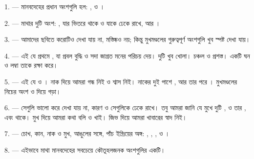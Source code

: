 %

\VUsaut{4.0mm}
\VUsaut{2.0mm}

\VUsaut{2.4mm}
\VUsaut{3.0mm}

1. --- মানবদেহের প্রধান অংশগুলি হল: ,  ও
।

\VUsaut{3.0mm}

2. --- মাথার দুটি অংশ: , যার ভিতরে  থাকে ও
যাকে  ঢেকে রাখে, আর ।

3. --- আমাদের ছবিতে করোটিও দেখা যায় না, মস্তিষ্কও নয়; কিন্তু মুখমণ্ডলের
গুরুত্বপূর্ণ অংশগুলি খুব স্পষ্ট দেখা যায়।

4. --- এই যে প্রথমে , যা প্রবল বুদ্ধি ও সদা জাগ্রত মনের পরিচয়
দেয়।  দুটি খুব খোলা।  চঞ্চল ও প্রশস্ত। একটি ঘন
 ও লম্বা  তাকে রক্ষা করে।

5. --- এই যে  ও । নাক দিয়ে আমরা গন্ধ নিই ও
শ্বাস নিই। নাকের দুই পাশে , আর তার পরে । মুখমণ্ডলের
নিচের অংশ  ও  দিয়ে গড়া।

6. --- সেগুলি ভালো করে দেখা যায় না, কারণ  ও 
সেগুলিকে ঢেকে রাখে। তবু আমরা জানি যে মুখে দুটি ,
 ও  তার , এবং
 থাকে। মুখ দিয়ে আমরা কথা বলি ও খাই। জিভ দিয়ে আমরা খাবারের
স্বাদ নিই।

7. --- চোখ, কান, নাক ও মুখ, আঙুলের সঙ্গে, পাঁচ ইন্দ্রিয়ের অঙ্গ:
, , ,  ও
।

8. --- এইভাবে মাথা মানবদেহের সবচেয়ে কৌতূহলজনক অংশগুলির একটি।

\VUsaut{4.4mm}
\VUsaut{3.0mm}

